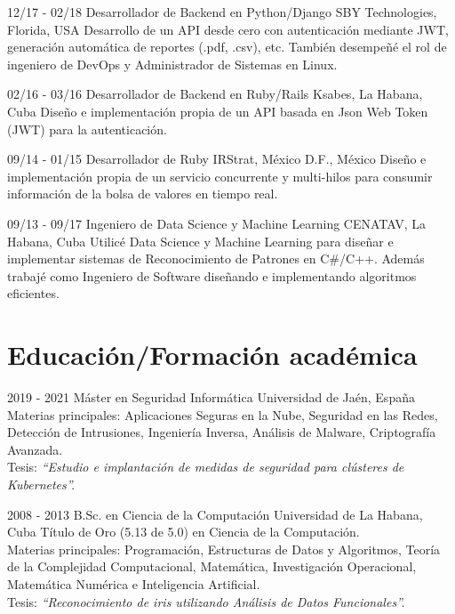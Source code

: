 \documentclass[]{friggeri-cv}
\begin{document}
\begin{entrylist}
  \entry
    {12/17 - 02/18}
    {Desarrollador de Backend en Python/Django}
    {SBY Technologies, Florida, USA}
    {Desarrollo de un API desde cero con autenticación mediante JWT, generación automática de reportes (.pdf, .csv), etc. También desempeñé el rol de ingeniero de DevOps y Administrador de Sistemas en Linux.\\}
    
  \entry
    {02/16 - 03/16}
    {Desarrollador de Backend en Ruby/Rails}
    {Ksabes, La Habana, Cuba}
    {Diseño e implementación propia de un API basada en Json Web Token (JWT) para la autenticación.\\}

  \entry
    {09/14 - 01/15}
    {Desarrollador de Ruby}
    {IRStrat, México D.F., México}
    {Diseño e implementación propia de un servicio concurrente y multi-hilos para consumir información de la bolsa de valores en tiempo real.\\}

  \entry
    {09/13 - 09/17}
    {Ingeniero de Data Science y Machine Learning}
    {CENATAV, La Habana, Cuba}
    {Utilicé Data Science y Machine Learning para diseñar e implementar sistemas de Reconocimiento de Patrones en C\#/C++. Además trabajé como Ingeniero de Software diseñando e implementando algoritmos eficientes.\\}
\end{entrylist}

\section{Educación/Formación académica}
\begin{entrylist}
  \entry
    {2019 - 2021}
    {Máster en Seguridad Informática}
    {Universidad de Jaén, España}
    {
      Materias principales: Aplicaciones Seguras en la Nube, Seguridad en las Redes, Detección de Intrusiones, Ingeniería Inversa, Análisis de Malware, Criptografía Avanzada.\\
      Tesis: \emph{``Estudio e implantación de medidas de seguridad para clústeres de Kubernetes''.}\\
    }

  \entry
    {2008 - 2013}
    {B.Sc. en Ciencia de la Computación}
    {Universidad de La Habana, Cuba}
    {Título de Oro (5.13 de 5.0) en Ciencia de la Computación.\\ Materias principales: Programación, Estructuras de Datos y Algoritmos, Teoría de la Complejidad Computacional, Matemática, Investigación Operacional, Matemática Numérica e Inteligencia Artificial.\\
    Tesis: \emph{``Reconocimiento de iris utilizando Análisis de Datos Funcionales''.}}

\end{entrylist}
\end{document}
